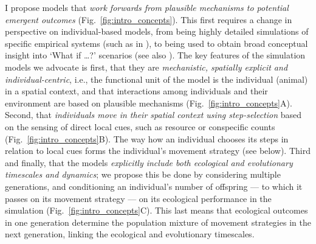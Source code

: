 I propose models that \textit{work forwards from plausible mechanisms to potential emergent outcomes} (Fig.~\ref{fig:intro_concepts}).
This first requires a change in perspective on individual-based models, from being highly detailed simulations of specific empirical systems (such as in \cite{diaz2021,stillman2010,bocedi2014}), to being used to obtain broad conceptual insight into `What if \ldots?' scenarios (see also \cite{white2018,gupte2021a,gupte2022c,netz2021,getz2015,getz2016}).
The key features of the simulation models we advocate is first, that they are \textit{mechanistic, spatially explicit and individual-centric}, i.e., the functional unit of the model is the individual (animal) in a spatial context, and that interactions among individuals and their environment are based on plausible mechanisms (Fig.~\ref{fig:intro_concepts}A).
Second, that \textit{individuals move in their spatial context using step-selection} based on the sensing of direct local cues, such as resource or conspecific counts (Fig.~\ref{fig:intro_concepts}B).
The way how an individual chooses its steps in relation to local cues forms the individual's movement strategy (see below).
Third and finally, that the models \textit{explicitly include both ecological and evolutionary timescales and dynamics}; we propose this be done by considering multiple generations, and conditioning an individual's number of offspring --- to which it passes on its movement strategy --- on its ecological performance in the simulation (Fig.~\ref{fig:intro_concepts}C).
This last means that ecological outcomes in one generation determine the population mixture of movement strategies in the next generation, linking the ecological and evolutionary timescales.

